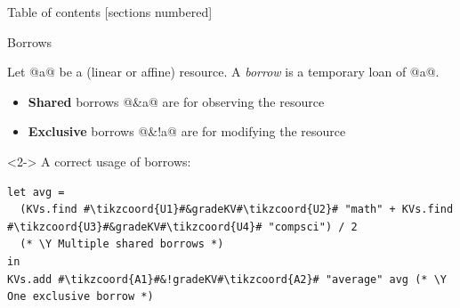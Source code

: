 \documentclass[aspectratio=169,dvipsnames,svgnames,10pt]{beamer}
\newcommand\Y{{\color{Green}{\ding{52}}}}
\begin{document}
\begin{frame}{Table of contents}
  [sections numbered]
\end{frame}

\begin{frame}[t,fragile]{Borrows}
  
  Let @a@ be a (linear or affine) resource. 
  A \emph{borrow} is a temporary loan of @a@.
  \begin{itemize}
  \item
    \textbf{Shared} borrows @&a@ are for observing the resource
  \item
    \textbf{Exclusive} borrows @&!a@ are for modifying the resource
  \end{itemize}

  \begin{onlyenv}<2->
  A correct usage of borrows:
\begin{verbatim}
let avg =
  (KVs.find #\tikzcoord{U1}#&gradeKV#\tikzcoord{U2}# "math" + KVs.find #\tikzcoord{U3}#&gradeKV#\tikzcoord{U4}# "compsci") / 2
  (* \Y Multiple shared borrows *)
in
KVs.add #\tikzcoord{A1}#&!gradeKV#\tikzcoord{A2}# "average" avg (* \Y One exclusive borrow *)
\end{verbatim}
  \end{onlyenv}  
\end{frame}
\end{document}
